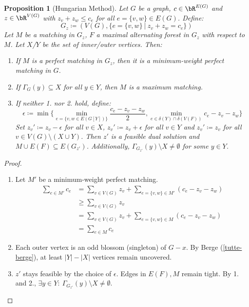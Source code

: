 \documentclass[11pt, a4paper]{article}
\newcommand{\abs}[1]{\left\lvert#1\right\rvert}
\newcommand{\set}[1]{\{#1\}}
\newtheorem{prop}[theorem]{Proposition}
\theoremstyle{remark}
\theoremstyle{definition}
\begin{document}
\begin{prop}[Hungarian Method]
Let $G$ be a graph, $c\in\bR^{E(G)}$ and $z\in\bR^{V(G)}$ with
$z_v+z_w\leq c_e$ for all $e=\set{v,w}\in E(G)$. Define:
\[G_z\coloneqq (V(G), \set{e=\set{v,w}\ |\ z_v+z_w=c_e})\]
Let $M$ be a matching in $G_z$, $F$ a maximal alternating forest in $G_z$
with respect to $M$. Let $X$/$Y$ be the set of inner/outer vertices. Then:
\begin{enumerate}
	\item If $M$ is a perfect matching in $G_z$, then it is a minimum-weight
	perfect matching in $G$.
	\item If $\Gamma_G(y)\subseteq X$ for all $y\in Y$, then $M$ is a
	maximum matching.
	\item If neither 1. nor 2. hold, define:
	\[
		\epsilon\coloneqq\min\set{
		\min_{e=\set{v,w\in E(G[Y])}}\frac{c_e-z_v-z_w}{2},
		\min_{e\in \delta(Y)\cap \delta(V(F))}c_e-z_v-z_w}
	\]
	Set $z_v'\coloneqq z_v-\epsilon$ for all $v\in X$,
	$z_v'\coloneqq z_v+\epsilon$ for all $v\in Y$ and $z_v'\coloneqq z_v$
	for all $v\in V(G)\setminus(X\cup Y)$. Then $z'$ is a feasible dual
	solution and $M\cup E(F)\subseteq E(G_{z'})$. Additionally,
	$\Gamma_{G_{z'}}(y)\setminus X\neq\emptyset$ for some $y\in Y$.
\end{enumerate}
\end{prop}
\begin{proof}
\begin{enumerate}
\item
Let $M'$ be a minimum-weight perfect matching.
\begin{align*}
	\sum_{e\in M'}c_e&=\sum_{v\in V(G)}z_v+\sum_{e=\set{v,w}\in M'}(c_e-z_v-z_w) \\
	&\geq \sum_{v\in V(G)}z_v \\
	&=\sum_{v\in V(G)}z_v+\sum_{e=\set{v,w}\in M}(c_e-z_v-z_w) \\
	&=\sum_{e\in M}c_e
\end{align*}

\item
Each outer vertex is an odd blossom (singleton) of $G-x$. By Berge
(\ref{tutte-berge}), at least $\abs{Y}-\abs{X}$ vertices remain uncovered.

\item
$z'$ stays feasible by the choice of $\epsilon$. Edges in $E(F),M$ remain
tight. By 1. and 2., $\exists y\in Y:\ \Gamma_{G_{z'}}(y)\setminus X\neq\emptyset$.

\end{enumerate}
\end{proof}
\end{document}
